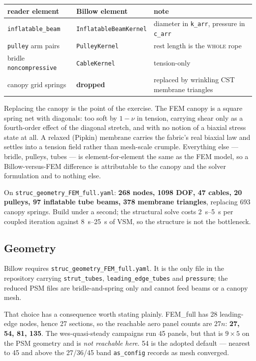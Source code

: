 \documentclass[11pt,a4paper]{article}
\newcommand{\code}[1]{\texttt{\small #1}}
\begin{document}
\begin{center}\small
\begin{tabular}{@{}lll@{}}
\toprule
\textbf{reader element} & \textbf{Billow element} & \textbf{note} \\
\midrule
\code{inflatable\_beam} & \code{InflatableBeamKernel} & diameter in \code{k\_arr}, pressure in \code{c\_arr} \\
\code{pulley} arm pairs & \code{PulleyKernel} & rest length is the \textsc{whole} rope \\
bridle \code{noncompressive} & \code{CableKernel} & tension-only \\
canopy grid springs & \textbf{dropped} & replaced by wrinkling CST membrane triangles \\
\bottomrule
\end{tabular}
\end{center}

Replacing the canopy is the point of the exercise. The FEM canopy is a square
spring net with diagonals: too soft by $1-\nu$ in tension, carrying shear only
as a fourth-order effect of the diagonal stretch, and with no notion of a
biaxial stress state at all. A relaxed (Pipkin) membrane carries the fabric's
real biaxial law and settles into a tension field rather than mesh-scale
crumple. Everything else --- bridle, pulleys, tubes --- is element-for-element
the same as the FEM model, so a Billow-versus-FEM difference is attributable to
the canopy and the solver formulation and to nothing else.

On \code{struc\_geometry\_FEM\_full.yaml}: \textbf{268 nodes, 1098 DOF, 47
cables, 20 pulleys, 97 inflatable tube beams, 378 membrane triangles},
replacing 693 canopy springs. Build under a second; the structural solve costs
\SIrange{2}{5}{\second} per coupled iteration against \SIrange{8}{25}{\second}
of VSM, so the structure is not the bottleneck.

\subsection{Geometry}

Billow requires \code{struc\_geometry\_FEM\_full.yaml}. It is the only file in
the repository carrying \code{strut\_tubes}, \code{leading\_edge\_tubes} and
\code{pressure}; the reduced PSM files are bridle-and-spring only and cannot
feed beams or a canopy mesh.

That choice has a consequence worth stating plainly. FEM\_full has 28
leading-edge nodes, hence 27 sections, so the reachable aero panel counts are
$27n$: \textbf{27, 54, 81, 135}. The wes-quasi-steady campaigns run 45 panels,
but that is $9\times5$ on the PSM geometry and is \emph{not reachable here}. 54
is the adopted default --- nearest to 45 and above the 27/36/45 band
\code{as\_config} records as mesh converged.
\end{document}
